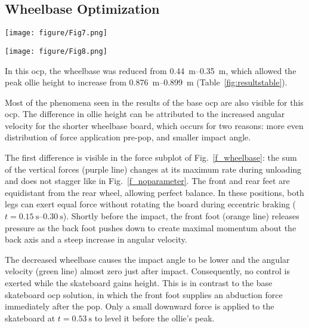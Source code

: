 \documentclass[default,iicol,pdflatex]{sn-jnl}
\begin{document}
\subsection{Wheelbase Optimization}
%
\begin{figure*}
    \centering
    \texttt{[image: figure/Fig7.png]}
    \caption[Trajectory, positions, speeds, and forces for wheelbase optimization]{Detailed trajectory of optimized wheelbase}\label{f_wheelbase}
\end{figure*}

\begin{figure*}
    \centering
    \texttt{[image: figure/Fig8.png]}
    \caption[Trajectory, positions, speeds, and forces for `all except tail length' optimization]{Detailed trajectory of optimization of all parameters except the tail}\label{f_notail}
\end{figure*}

In this \gls{ocp}, the wheelbase was reduced from \SIrange{0.44}{0.35}{\meter}, which allowed the peak ollie height to increase from \SIrange{0.876}{0.899}{\meter} (Table~\ref{fig:resultstable}).

Most of the phenomena seen in the results of the base \gls{ocp} are also visible for this \gls{ocp}.
The difference in ollie height can be attributed to the increased angular velocity for the shorter wheelbase board, which occurs for two reasons: more even distribution of force application pre-pop, and smaller impact angle.

The first difference is visible in the force subplot of Fig.~\ref{f_wheelbase}: the sum of the vertical forces (purple line) changes at its maximum rate during unloading and does not stagger like in Fig.~\ref{f_noparameter}.
The front and rear feet are equidistant from the rear wheel, allowing perfect balance.
In these positions, both legs can exert equal force without rotating the board during eccentric braking ($t=\SIrange{0.15}{0.30}{\second}$). 
Shortly before the impact, the front foot (orange line) releases pressure as the back foot pushes down to create maximal momentum about the back axis and a steep increase in angular velocity.

The decreased wheelbase causes the impact angle to be lower and the angular velocity (green line) almost zero just after impact.
Consequently, no control is exerted while the skateboard gains height.
This is in contrast to the base skateboard \gls{ocp} solution, in which the front foot supplies an abduction force immediately after the pop.
Only a small downward force is applied to the skateboard at $t=\SI{0.53}{\second}$ to level it before the ollie's peak. 
\end{document}
